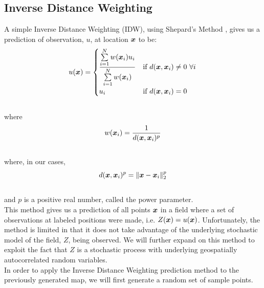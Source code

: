 \documentclass[11pt]{ucthesis}
\newcommand{\vect}[1]{{\it{\boldsymbol{#1}}}}
\begin{document}
\subsection{Inverse Distance Weighting}
A simple Inverse Distance Weighting (IDW), using Shepard's Method \cite{shepard:idw}, gives us a prediction of observation, $u$, at location $\vect{x}$ to be:
\begin{equation}
	u(\vect{x})=\begin{cases}
			\dfrac{\sum\limits_{i=1}^N w(\vect{x}_i)u_i}{\sum\limits_{i=1}^{N} w(\vect{x}_i)} & \text{if}\ d(\vect{x},\vect{x}_i) \neq 0\ \forall i \\
			u_i & \text{if}\ d(\vect{x},\vect{x}_{i})=0\\
		\end{cases}
\end{equation}\\
where\\
\begin{equation}
	w(\vect{x}_i)=\frac{1}{d(\vect{x},\vect{x}_{i})^{p}}
\end{equation}\\
where, in our cases,\\
\begin{equation}
	d(\vect{x},\vect{x}_{i})^{p} = \|\vect{x}-\vect{x}_i\|_{2}^p
\end{equation}\\
and $p$ is a positive real number, called the power parameter.\\ %
This method gives us a prediction of all points $\vect{x}$ in a field where a set of observations at labeled positions were made, i.e. $Z(\vect{x})=u(\vect{x})$. Unfortunately, the method is limited in that it does not take advantage of the underlying stochastic model of the field, $Z$, being observed. We will further expand on this method to exploit the fact that $Z$ is a stochastic process with underlying geospatially autocorrelated random variables.\\
In order to apply the Inverse Distance Weighting prediction method to the previously generated map, we will first generate a random set of sample points.
\end{document}
